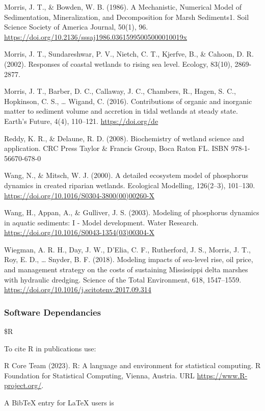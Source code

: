 \documentclass[
]{article}
\begin{document}
Morris, J. T., \& Bowden, W. B. (1986). A Mechanistic, Numerical Model
of Sedimentation, Mineralization, and Decomposition for Marsh
Sediments1. Soil Science Society of America Journal, 50(1), 96.
\url{https://doi.org/10.2136/sssaj1986.03615995005000010019x}

Morris, J. T., Sundareshwar, P. V., Nietch, C. T., Kjerfve, B., \&
Cahoon, D. R. (2002). Responses of coastal wetlands to rising sea level.
Ecology, 83(10), 2869-2877.

Morris, J. T., Barber, D. C., Callaway, J. C., Chambers, R., Hagen, S.
C., Hopkinson, C. S., \ldots{} Wigand, C. (2016). Contributions of
organic and inorganic matter to sediment volume and accretion in tidal
wetlands at steady state. Earth's Future, 4(4), 110--121.
\url{https://doi.org/de}

Reddy, K. R., \& Delaune, R. D. (2008). Biochemistry of wetland science
and application. CRC Press Taylor \& Francis Group, Boca Raton FL. ISBN
978-1-56670-678-0

Wang, N., \& Mitsch, W. J. (2000). A detailed ecosystem model of
phosphorus dynamics in created riparian wetlands. Ecological Modelling,
126(2--3), 101--130. \url{https://doi.org/10.1016/S0304-3800(00)00260-X}

Wang, H., Appan, A., \& Gulliver, J. S. (2003). Modeling of phosphorus
dynamics in aquatic sediments: I - Model development. Water Research.
\url{https://doi.org/10.1016/S0043-1354(03)00304-X}

Wiegman, A. R. H., Day, J. W., D'Elia, C. F., Rutherford, J. S., Morris,
J. T., Roy, E. D., \ldots{} Snyder, B. F. (2018). Modeling impacts of
sea-level rise, oil price, and management strategy on the costs of
sustaining Mississippi delta marshes with hydraulic dredging. Science of
the Total Environment, 618, 1547--1559.
\url{https://doi.org/10.1016/j.scitotenv.2017.09.314}

\hypertarget{software-dependancies}{%
\subsubsection{Software Dependancies}\label{software-dependancies}}

\$R

To cite R in publications use:

R Core Team (2023). R: A language and environment for statistical
computing. R Foundation for Statistical Computing, Vienna, Austria. URL
\url{https://www.R-project.org/}.

A BibTeX entry for LaTeX users is
\end{document}
